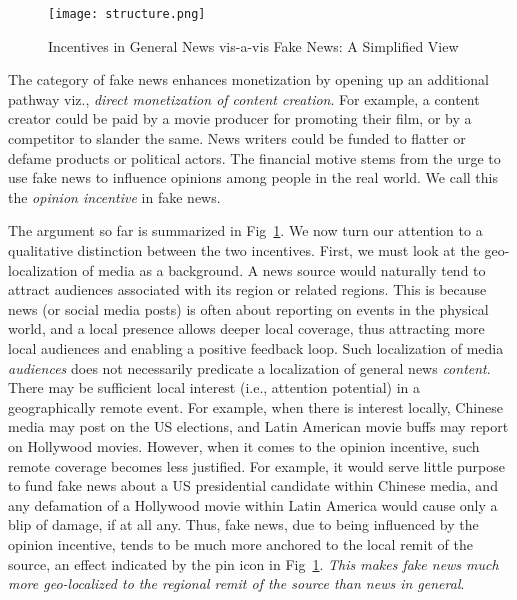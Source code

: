 \documentclass[runningheads]{llncs}
\begin{document}
\begin{figure}
\vspace{-0.3in}
  \texttt{[image: structure.png]}
  \caption{Incentives in General News vis-a-vis Fake News: A Simplified View}
  \label{fig:structure}
  \vspace{-0.2in}
\end{figure}

The category of fake news enhances monetization by opening up an additional pathway viz., {\it direct monetization of content creation}. For example, a content creator could be paid by a movie producer for promoting their film, or by a competitor to slander the same. News writers could be funded to flatter or defame products or political actors. The financial motive stems from the urge to use fake news to influence opinions among people in the real world. We call this the {\it opinion incentive} in fake news. 

The argument so far is summarized in Fig~\ref{fig:structure}. We now turn our attention to a qualitative distinction between the two incentives. First, we must look at the geo-localization of media as a background. A news source would naturally tend to attract audiences associated with its region or related regions. This is because news (or social media posts) is often about reporting on events in the physical world, and a local presence allows deeper local coverage, thus attracting more local audiences and enabling a positive feedback loop. Such localization of media {\it audiences} does not necessarily predicate a localization of general news {\it content}. There may be sufficient local interest (i.e., attention potential) in a geographically remote event. For example, when there is interest locally, Chinese media may post on the US elections, and Latin American movie buffs may report on Hollywood movies. However, when it comes to the opinion incentive, such remote coverage becomes less justified. For example, it would serve little purpose to fund fake news about a US presidential candidate within Chinese media, and any defamation of a Hollywood movie within Latin America would cause only a blip of damage, if at all any. Thus, fake news, due to being influenced by the opinion incentive, tends to be much more anchored to the local remit of the source, an effect indicated by the pin icon in Fig~\ref{fig:structure}. {\it This makes fake news much more geo-localized to the regional remit of the source than news in general}.

\end{document}
